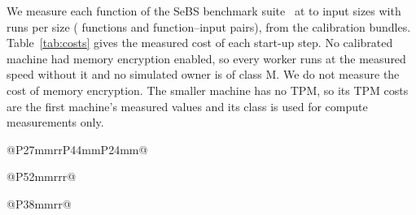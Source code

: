 We measure each function of the SeBS benchmark suite~\cite{copik2021sebs} at \VMachSizesLo{} to \VMachSizesHi{} input
sizes with \VMachRuns{} runs per size (\VMachFns{} functions and \VMachPairs{} function--input pairs), from the
calibration bundles. Table~\ref{tab:costs} gives the measured cost of each start-up step. No calibrated machine had
memory encryption enabled, so every worker runs at the measured speed without it and no simulated owner is of class M.
We do not measure the cost of memory encryption. The smaller machine has no TPM, so its TPM costs are the first
machine's measured values and its class is used for compute measurements only.

\begin{table}[t]
\caption{Calibrated machine classes. Memory is the usable memory reported by the operating system. The first two
rows are the two disk classes of one machine. The third row is a machine without a TPM, so its TPM steps are the
first machine's.}
\label{tab:machines}
\footnotesize
\setlength{\tabcolsep}{3pt}
\begin{tabular}{@{}P{27mm}rrP{44mm}P{24mm}@{}}
\toprule

\end{tabular}
\end{table}

\begin{table}[t]
\caption{Measured cost of each start-up step per calibrated machine class. TPM steps on a machine without a TPM are
the first machine's measured values, and its power-on row includes them. Snapshot load is the time to load the
snapshot. Reads of the pages the function touches are modelled separately.}
\label{tab:costs}
\small
\begin{tabular}{@{}P{52mm}rrr@{}}
\toprule

\end{tabular}
\end{table}

\begin{table}[t]
\caption{Concurrency limit, memory and measured co-run slowdown of each calibrated machine. Slowdown is the median
ratio of the execution time with $n$ concurrent sandboxes to the time with one, with the range over functions in
parentheses. The last row gives the number of functions measured at 2 and at the limit.}
\label{tab:capacity}
\small
\begin{tabular}{@{}P{38mm}rr@{}}
\toprule

\end{tabular}
\end{table}

